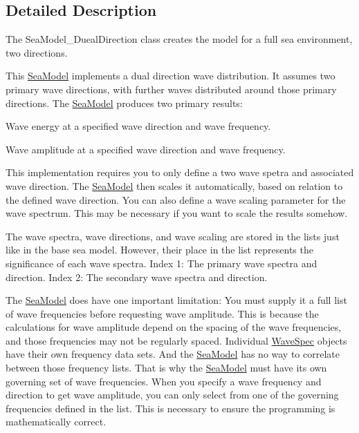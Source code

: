 \subsection{Detailed Description}
The Sea\-Model\-\_\-\-Dueal\-Direction class creates the model for a full sea environment, two directions. 

This \hyperlink{classosea_1_1_sea_model}{Sea\-Model} implements a dual direction wave distribution. It assumes two primary wave directions, with further waves distributed around those primary directions. The \hyperlink{classosea_1_1_sea_model}{Sea\-Model} produces two primary results\-:
\begin{DoxyEnumerate}
\item Wave energy at a specified wave direction and wave frequency.
\item Wave amplitude at a specified wave direction and wave frequency.
\end{DoxyEnumerate}

This implementation requires you to only define a two wave spetra and associated wave direction. The \hyperlink{classosea_1_1_sea_model}{Sea\-Model} then scales it automatically, based on relation to the defined wave direction. You can also define a wave scaling parameter for the wave spectrum. This may be necessary if you want to scale the results somehow.

The wave spectra, wave directions, and wave scaling are stored in the lists just like in the base sea model. However, their place in the list represents the significance of each wave spectra. Index 1\-: The primary wave spectra and direction. Index 2\-: The secondary wave spectra and direction.

The \hyperlink{classosea_1_1_sea_model}{Sea\-Model} does have one important limitation\-: You must supply it a full list of wave frequencies before requesting wave amplitude. This is because the calculations for wave amplitude depend on the spacing of the wave frequencies, and those frequencies may not be regularly spaced. Individual \hyperlink{classosea_1_1_wave_spec}{Wave\-Spec} objects have their own frequency data sets. And the \hyperlink{classosea_1_1_sea_model}{Sea\-Model} has no way to correlate between those frequency lists. That is why the \hyperlink{classosea_1_1_sea_model}{Sea\-Model} must have its own governing set of wave frequencies. When you specify a wave frequency and direction to get wave amplitude, you can only select from one of the governing frequencies defined in the list. This is necessary to ensure the programming is mathematically correct.

